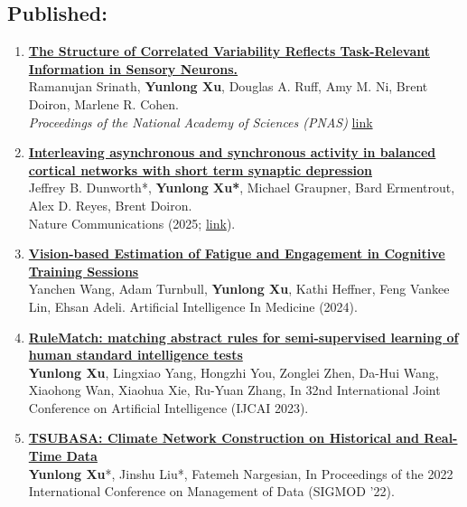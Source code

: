 \documentclass[10pt,letterpaper]{article}
\begin{document}
\subsection{Published:}
\begin{enumerate}

\item \textbf{\href{https://www.pnas.org/doi/10.1073/pnas.2523217123}{The Structure of Correlated Variability Reflects Task-Relevant Information in Sensory Neurons.}}\\
Ramanujan Srinath, \textbf{Yunlong Xu}, Douglas A. Ruff, Amy M. Ni, Brent Doiron, Marlene R. Cohen.\\
\textit{Proceedings of the National Academy of Sciences (PNAS)} \href{https://www.pnas.org/doi/10.1073/pnas.2523217123}{link}\\

\item \textbf{ \href{https://doi.org/10.1038/s41467-025-63818-z}{Interleaving asynchronous and synchronous activity in balanced cortical networks with short term synaptic depression}}\\
Jeffrey B. Dunworth*, \textbf{Yunlong Xu*}, Michael Graupner, Bard Ermentrout, Alex D. Reyes, Brent Doiron. \\ Nature Communications (2025; \href{https://doi.org/10.1038/s41467-025-63818-z}{link}).\\

\item \textbf{\href{https://doi.org/10.1016/j.artmed.2024.102923}{Vision-based Estimation of Fatigue and Engagement in Cognitive Training Sessions}}\\
Yanchen Wang, Adam Turnbull, \textbf{Yunlong Xu}, Kathi Heffner, Feng Vankee Lin, Ehsan Adeli.  Artificial Intelligence In Medicine (2024).\\

\item \textbf{\href{https://www.ijcai.org/proceedings/2023/179}{RuleMatch: matching abstract rules for semi-supervised learning of human standard intelligence tests}}\\
\textbf{Yunlong Xu}, Lingxiao Yang, Hongzhi You, Zonglei Zhen, Da-Hui Wang, Xiaohong Wan, Xiaohua Xie, Ru-Yuan Zhang, In 32nd International Joint Conference on Artificial Intelligence (IJCAI 2023).\\

\item \textbf{\href{https://dl.acm.org/doi/abs/10.1145/3514221.3526177}{TSUBASA: Climate Network Construction on Historical and Real-Time Data}} \\
\textbf{Yunlong Xu}*, Jinshu Liu*, Fatemeh Nargesian, In Proceedings of the 2022 International Conference on Management of Data (SIGMOD '22).\\


\end{enumerate}
\end{document}
